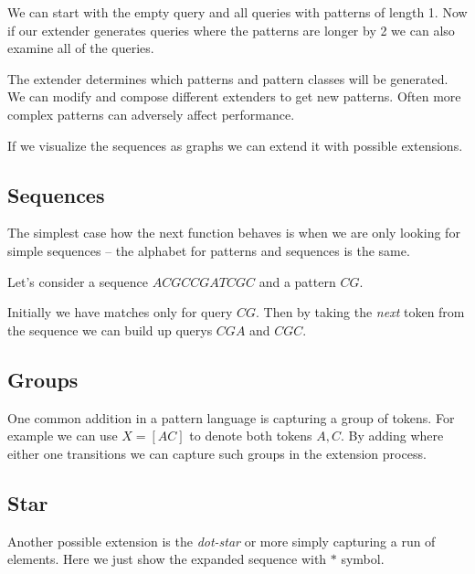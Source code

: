 \begin{exmp}
We can start with the empty query and all queries with patterns of length 1. Now if our extender generates queries where the patterns are longer by 2 we can also examine all of the queries.
\end{exmp}

The extender determines which patterns and pattern classes will be generated. We can modify and compose different extenders to get new patterns. Often more complex patterns can adversely affect performance.


If we visualize the sequences as graphs we can extend it with possible extensions.

\subsection{Sequences}

The simplest case how the next function behaves is when we are only looking for simple sequences -- the alphabet for patterns and sequences is the same.

Let's consider a sequence $ACGCCGATCGC$ and a pattern $CG$.

\begin{figure}[H]
	
\end{figure}

Initially we have matches only for query $CG$. Then by taking the \emph{next} token from the sequence we can build up querys $CGA$ and $CGC$.

\subsection{Groups}

One common addition in a pattern language is capturing a group of tokens. For example we can use $X = [AC]$ to denote both tokens $A, C$. By adding where either one transitions we can capture such groups in the extension process.\

\begin{figure}[H]
	
\end{figure}

\subsection{Star}

Another possible extension is the \emph{dot-star} or more simply capturing a run of elements. Here we just show the expanded sequence with $*$ symbol.

